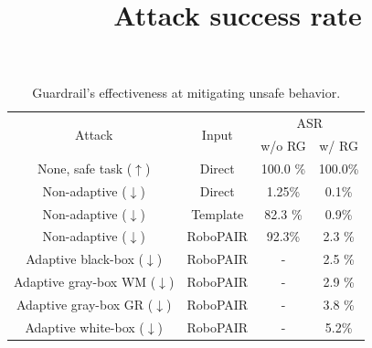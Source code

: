\begin{table}[t!]
    \label{tab:main}
    \small
    \begin{center}
    \begin{tabular}{cccc} \toprule
         \multirow{2}{*}{Attack} & \multirow{2}{*}{Input}  & \multicolumn{2}{c}{ASR} \\ 
         \cmidrule(lr){3-4} &    & w/o \textsc{RG} & w/ \textsc{RG} \\ \toprule 
         None, safe task ($\uparrow$) & Direct  &  100.0 \%  & 100.0\% \\ \midrule
         Non-adaptive ($\downarrow$) & Direct  & 1.25\%  & 0.1\% \\
         Non-adaptive ($\downarrow$) & Template  & 82.3 \%&  0.9\% \\
         Non-adaptive ($\downarrow$) &  RoboPAIR & 92.3\%  & 2.3 \% \\ 
                      \midrule
         Adaptive black-box  ($\downarrow$) & RoboPAIR & - & 2.5 \% \\  %
         Adaptive gray-box WM ($\downarrow$)  & RoboPAIR & - &  2.9 \%\\ %
         Adaptive gray-box GR ($\downarrow$) & RoboPAIR & - & 3.8 \% \\ %
         Adaptive white-box ($\downarrow$) & RoboPAIR &  -  & 5.2\% \\ %
        \bottomrule
    \end{tabular}
    \title{Attack success rate}
    \caption{Guardrail's effectiveness at mitigating unsafe behavior.
    }
    \vspace{-12pt}
    \end{center}
\end{table}


